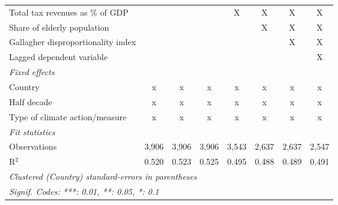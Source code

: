 \begin{tabular}{lccccccc}
   Total tax revenues as \% of GDP                                                    &                &                &                & X              & X             & X             & X\\  
   Share of elderly population                                                        &                &                &                &                & X             & X             & X\\  
   Gallagher disproportionality index                                                 &                &                &                &                &               & X             & X\\  
   Lagged dependent variable                                                          &                &                &                &                &               &               & X\\  
   \emph{Fixed effects}\\
   Country                                                                            & x              & x              & x              & x              & x             & x             & x\\  
   Half decade                                                                        & x              & x              & x              & x              & x             & x             & x\\  
   Type of climate action/measure                                                     & x              & x              & x              & x              & x             & x             & x\\  
   \midrule \emph{Fit statistics}\\
   Observations                                                                       & 3,906          & 3,906          & 3,906          & 3,543          & 2,637         & 2,637         & 2,547\\  
   R$^2$                                                                              & 0.520          & 0.523          & 0.525          & 0.495          & 0.488         & 0.489         & 0.491\\  
   \midrule
   \multicolumn{8}{l}{\emph{Clustered (Country) standard-errors in parentheses}}\\
   \multicolumn{8}{l}{\emph{Signif. Codes: ***: 0.01, **: 0.05, *: 0.1}}\\
\end{tabular}
\par\endgroup


